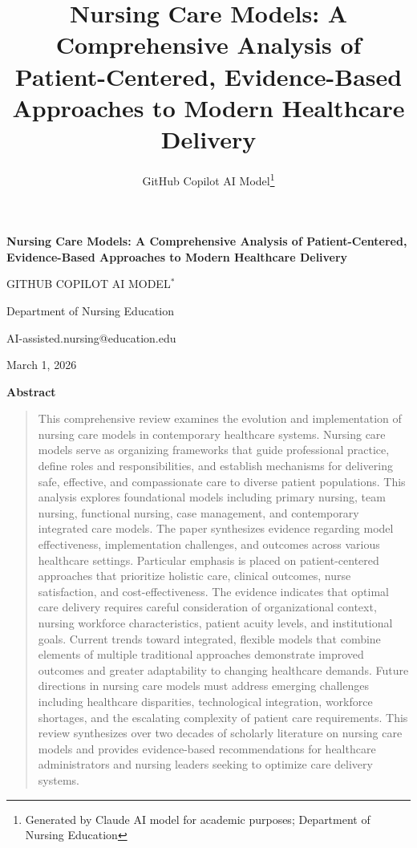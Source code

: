 \documentclass[12pt]{article}
\title{\textbf{Nursing Care Models: A Comprehensive Analysis of Patient-Centered, Evidence-Based Approaches to Modern Healthcare Delivery}}
\author{GitHub Copilot AI Model\thanks{Generated by Claude AI model for academic purposes; Department of Nursing Education}}
\date{}
\begin{document}
\begin{center}
\vspace*{0.5in}
{\Large\textbf{Nursing Care Models: A Comprehensive Analysis of Patient-Centered, Evidence-Based Approaches to Modern Healthcare Delivery}}

\vspace{0.3in}
{\normalsize GITHUB COPILOT AI MODEL$^*$}

\vspace{0.15in}
{\normalsize Department of Nursing Education}

{\normalsize AI-assisted.nursing@education.edu}

\vspace{0.15in}
{\normalsize March 1, 2026}

\vspace{0.3in}
{\textbf{Abstract}}
\end{center}

\begin{quotation}
\noindent
This comprehensive review examines the evolution and implementation of nursing care models in contemporary healthcare systems. Nursing care models serve as organizing frameworks that guide professional practice, define roles and responsibilities, and establish mechanisms for delivering safe, effective, and compassionate care to diverse patient populations. This analysis explores foundational models including primary nursing, team nursing, functional nursing, case management, and contemporary integrated care models. The paper synthesizes evidence regarding model effectiveness, implementation challenges, and outcomes across various healthcare settings. Particular emphasis is placed on patient-centered approaches that prioritize holistic care, clinical outcomes, nurse satisfaction, and cost-effectiveness. The evidence indicates that optimal care delivery requires careful consideration of organizational context, nursing workforce characteristics, patient acuity levels, and institutional goals. Current trends toward integrated, flexible models that combine elements of multiple traditional approaches demonstrate improved outcomes and greater adaptability to changing healthcare demands. Future directions in nursing care models must address emerging challenges including healthcare disparities, technological integration, workforce shortages, and the escalating complexity of patient care requirements. This review synthesizes over two decades of scholarly literature on nursing care models and provides evidence-based recommendations for healthcare administrators and nursing leaders seeking to optimize care delivery systems.
\end{quotation}
\end{document}
